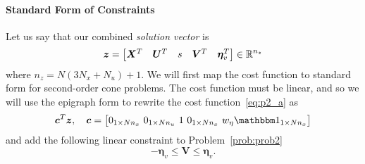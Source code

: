 \documentclass[12pt]{article}
\begin{document}
\paragraph{Standard Form of Constraints}

Let us say that our combined \textit{solution vector} is 
\begin{equation*}
\bm{z} = \begin{bmatrix}
\bm{X}^T & \bm{U}^T & s & \bm{V}^T & \bm{\eta}_v^T
\end{bmatrix} \in {\mathbb{R}}^{n_z}
\end{equation*}
where $n_z = N(3N_x + N_u)+1$. We will first map the cost function to standard form for second-order cone problems. The cost function must be linear, and so we will use the epigraph form to rewrite the cost function~\eqref{eq:p2_a} as
\begin{equation}
\bm{c}^T \bm{z}, \quad \bm{c} = \big[ \zeros{1}{N n_x} \ \zeros{1}{N n_u} \ 1 \ \zeros{1}{N n_x} \ w_{\eta} \ones{1}{N n_x} \big]
\label{eq:std_cost}
\end{equation}
and add the following linear constraint to Problem~\ref{prob:prob2}
\begin{equation}
- \bm{\eta}_v \leq \bm{V} \leq \bm{\eta}_v.
\label{eq:p2_epi}
\end{equation}
\end{document}
